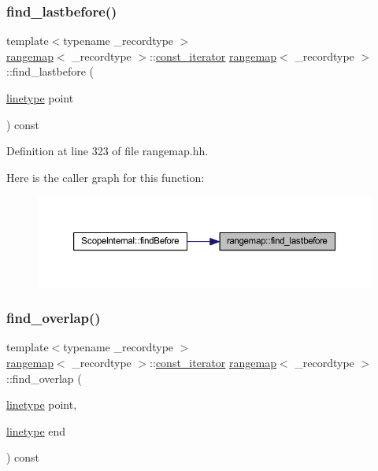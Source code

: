 \subsubsection{\texorpdfstring{find\_lastbefore()}{find\_lastbefore()}}
{\footnotesize\ttfamily template$<$typename \+\_\+recordtype $>$ \\
\mbox{\hyperlink{classrangemap}{rangemap}}$<$ \+\_\+recordtype $>$\+::\mbox{\hyperlink{classrangemap_affa7462e68d053d3a066fe0b8d46a99d}{const\+\_\+iterator}} \mbox{\hyperlink{classrangemap}{rangemap}}$<$ \+\_\+recordtype $>$\+::find\+\_\+lastbefore (\begin{DoxyParamCaption}\item[{\mbox{\hyperlink{classrangemap_a54c8f7622f9af4c4232d764cf9ed11fa}{linetype}}}]{point }\end{DoxyParamCaption}) const}



Definition at line 323 of file rangemap.\+hh.

Here is the caller graph for this function\+:
\nopagebreak
\begin{figure}[H]
\begin{center}
\leavevmode
\includegraphics[width=350pt]{classrangemap_a0acf9c66dfc36b41d1a1062fa6692ff7_icgraph}
\end{center}
\end{figure}
\mbox{\label{classrangemap_a69c6328ba555fbb5382307ea9a2d9ca9}} 
\subsubsection{\texorpdfstring{find\_overlap()}{find\_overlap()}}
{\footnotesize\ttfamily template$<$typename \+\_\+recordtype $>$ \\
\mbox{\hyperlink{classrangemap}{rangemap}}$<$ \+\_\+recordtype $>$\+::\mbox{\hyperlink{classrangemap_affa7462e68d053d3a066fe0b8d46a99d}{const\+\_\+iterator}} \mbox{\hyperlink{classrangemap}{rangemap}}$<$ \+\_\+recordtype $>$\+::find\+\_\+overlap (\begin{DoxyParamCaption}\item[{\mbox{\hyperlink{classrangemap_a54c8f7622f9af4c4232d764cf9ed11fa}{linetype}}}]{point,  }\item[{\mbox{\hyperlink{classrangemap_a54c8f7622f9af4c4232d764cf9ed11fa}{linetype}}}]{end }\end{DoxyParamCaption}) const}



